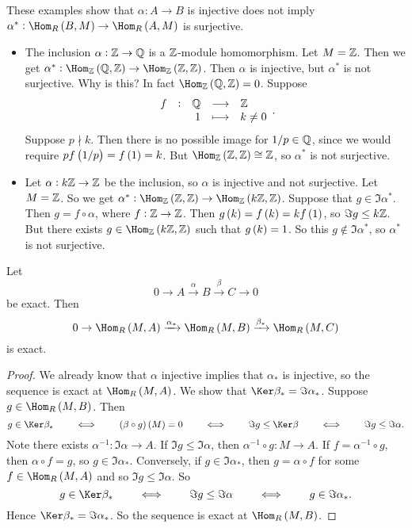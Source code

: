 \begin{example*}
These examples show that $ \alpha : A \to B $ is injective does not imply $ \alpha^* : \Hom_R\br{B, M} \to \Hom_R\br{A, M} $ is surjective.
\begin{itemize}
\item The inclusion $ \alpha : \mathbb{Z} \to \mathbb{Q} $ is a $ \mathbb{Z} $-module homomorphism. Let $ M = \mathbb{Z} $. Then we get $ \alpha^* : \Hom_\ZZ\br{\QQ, \ZZ} \to \Hom_\ZZ\br{\ZZ, \ZZ} $. Then $ \alpha $ is injective, but $ \alpha^* $ is not surjective. Why is this? In fact $ \Hom_\ZZ\br{\QQ, \ZZ} = 0 $. Suppose
$$ \function[f]{\QQ}{\ZZ}{1}{k \ne 0}. $$
Suppose $ p \nmid k $. Then there is no possible image for $ 1 / p \in \mathbb{Q} $, since we would require $ pf\br{1 / p} = f\br{1} = k $. But $ \Hom_\ZZ\br{\ZZ, \ZZ} \cong \ZZ $, so $ \alpha^* $ is not surjective.
\item Let $ \alpha : k\mathbb{Z} \to \mathbb{Z} $ be the inclusion, so $ \alpha $ is injective and not surjective. Let $ M = \mathbb{Z} $. So we get $ \alpha^* : \Hom_\ZZ\br{\ZZ, \ZZ} \to \Hom_\ZZ\br{k\ZZ, \ZZ} $. Suppose that $ g \in \Im \alpha^* $. Then $ g = f \circ \alpha $, where $ f : \mathbb{Z} \to \mathbb{Z} $. Then $ g\br{k} = f\br{k} = kf\br{1} $, so $ \Im g \le k\mathbb{Z} $. But there exists $ g \in \Hom_\ZZ\br{k\ZZ, \ZZ} $ such that $ g\br{k} = 1 $. So this $ g \notin \Im \alpha^* $, so $ \alpha^* $ is not surjective.
\end{itemize}
\end{example*}

\begin{proposition}
Let
$$ 0 \to A \xrightarrow{\alpha} B \xrightarrow{\beta} C \to 0 $$
be exact. Then
$$ 0 \to \Hom_R\br{M, A} \xrightarrow{\alpha_*} \Hom_R\br{M, B} \xrightarrow{\beta_*} \Hom_R\br{M, C} $$
is exact.
\end{proposition}

\begin{proof}
We already know that $ \alpha $ injective implies that $ \alpha_* $ is injective, so the sequence is exact at $ \Hom_R\br{M, A} $. We show that $ \Ker \beta_* = \Im \alpha_* $. Suppose $ g \in \Hom_R\br{M, B} $. Then
$$ g \in \Ker \beta_* \qquad \iff \qquad \br{\beta \circ g}\br{M} = 0 \qquad \iff \qquad \Im g \le \Ker \beta \qquad \iff \qquad \Im g \le \Im \alpha. $$
Note there exists $ \alpha^{-1} : \Im \alpha \to A $. If $ \Im g \le \Im \alpha $, then $ \alpha^{-1} \circ g : M \to A $. If $ f = \alpha^{-1} \circ g $, then $ \alpha \circ f = g $, so $ g \in \Im \alpha_* $. Conversely, if $ g \in \Im \alpha_* $, then $ g = \alpha \circ f $ for some $ f \in \Hom_R\br{M, A} $ and so $ \Im g \le \Im \alpha $. So
$$ g \in \Ker \beta_* \qquad \iff \qquad \Im g \le \Im \alpha \qquad \iff \qquad g \in \Im \alpha_*. $$
Hence $ \Ker \beta_* = \Im \alpha_* $. So the sequence is exact at $ \Hom_R\br{M, B} $.
\end{proof}

